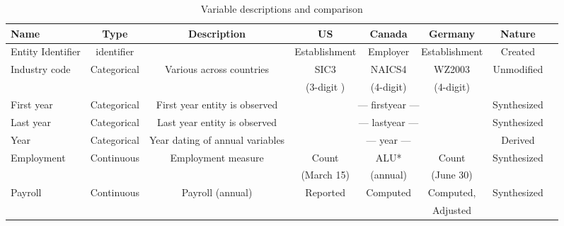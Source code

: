 \begin{table}[H]
  \centering\footnotesize
  \caption{Variable descriptions and comparison}  \label{tab:common_Variable} \medskip
  \renewcommand{\arraystretch}{1}
 \setlength{\tabcolsep}{4.5pt}
 \begin{tabular}{l  c c c c c c c}
    \toprule
    \textbf{Name}&\textbf{Type} &\textbf{Description} &\textbf{US} & \textbf{Canada} &\textbf{Germany} &\textbf{Nature}\\
    \midrule
Entity Identifier& identifier& & Establishment & Employer & Establishment &Created\\
Industry code&Categorical& Various across countries &SIC3 & NAICS4 & WZ2003 &Unmodified\\
             &           &                          &(3-digit )& (4-digit) &(4-digit)  &\\
First year&Categorical&First year entity is observed &\multicolumn{3}{c}{--- firstyear ---}&Synthesized\\
Last year&Categorical&Last year entity is observed &\multicolumn{3}{c}{--- lastyear ---}&Synthesized\\
Year&Categorical&Year dating of annual variables&\multicolumn{3}{c}{--- year ---}&Derived\\
Employment & Continuous & Employment measure & Count & ALU* & Count & Synthesized \\
            &            &                    & (March 15) &(annual)& (June 30)&\\
Payroll&Continuous&  Payroll (annual)& Reported & Computed & Computed,  &Synthesized\\
       &          &                  &          &          & Adjusted\\
   \bottomrule
  \end{tabular} 
\end{table}